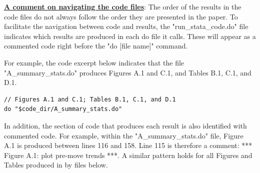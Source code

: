 \documentclass[
]{article}
\begin{document}
\underline{\textbf{A comment on navigating the code files}}: The order of the results in the code files do not always follow the order they are presented in the paper. To facilitate the navigation between code and results, the "run\_stata\_code.do" file indicates which results are produced in each do file it calls. These will appear as a {\color{statagreen}commented code} right before the "do [file name]" command. 

For example, the code excerpt below indicates that the file "A\_summary\_stats.do" produces Figures A.1 and C.1, and Tables B.1, C.1, and D.1. 
\begin{verbatim}
// Figures A.1 and C.1; Tables B.1, C.1, and D.1
do "$code_dir/A_summary_stats.do"
\end{verbatim}

In addition, the section of code that produces each result is also identified with commented code. For example, within the "A\_summary\_stats.do" file, Figure A.1 is produced between lines 116 and 158. Line 115 is therefore a comment: {\color{statagreen}*** Figure A.1: plot pre-move trends ***}. A similar pattern holds for all Figures and Tables produced in by files below.
\end{document}
